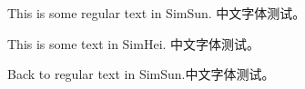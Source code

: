 \documentclass{article}
\begin{document}
This is some regular text in SimSun.
中文字体测试。

{\simhei This is some text in SimHei. 中文字体测试。}

Back to regular text in SimSun.中文字体测试。
\end{document}
